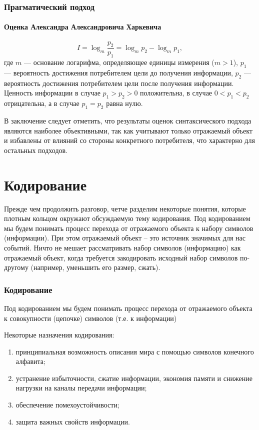 \begin{frame}
\frametitle{Прагматический подход}
\framesubtitle{Оценка Александра Александровича Харкевича}
\begin{equation}
    I=\log_{m}\frac{p_2}{p_1}=\log_{m}p_2 - \log_{m}p_1,
\end{equation}
где $m$ --- основание логарифма, определяющее единицы измерения ($m>1$), $p_1$ --- вероятность достижения потребителем \alert{цели} до получения информации, $p_2$ --- вероятность достижения потребителем цели после получения информации. Ценность информации в случае $p_1>p_2>0$ положительна, в случае $0<p_1<p_2$ отрицательна, а в случае $p_1=p_2$ равна нулю.
\end{frame}

В заключение следует отметить, что результаты оценок синтаксического подхода являются наиболее объективными, так как учитывают только отражаемый объект и избавлены от влияний со стороны конкретного потребителя, что характерно для остальных подходов.


\section{Кодирование}


Прежде чем продолжить разговор, четче разделим некоторые понятия, которые плотным кольцом окружают обсуждаемую тему кодирования. Под кодированием мы будем понимать процесс перехода от отражаемого объекта к набору символов (информации). При этом отражаемый объект – это источник значимых для нас событий. Ничто не мешает рассматривать набор символов (информацию) как отражаемый объект, когда требуется закодировать исходный набор символов по-другому (например, уменьшить его размер, сжать).


\begin{frame}
\frametitle{Кодирование}
\begin{definition}
    Под \alert{кодированием} мы будем понимать процесс перехода от \alert{отражаемого объекта} к совокупности (цепочке) \alert{символов} (т.е. к информации)
\end{definition}
Некоторые назначения кодирования:
\begin{enumerate}
    \item принципиальная возможность описания мира с помощью символов конечного алфавита;
    \item устранение избыточности, сжатие информации, экономия памяти и снижение нагрузки на каналы передачи информации;
    \item обеспечение помехоустойчивости;
    \item защита важных свойств информации.
\end{enumerate}
\end{frame}


